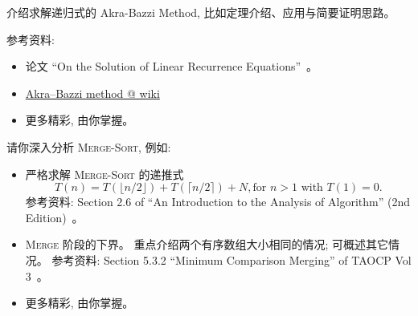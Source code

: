 \documentclass[a4paper, justified]{tufte-handout}
\begin{document}
\begin{solution}
\end{solution}

\beginoptional

\begin{problem}
\end{problem}

\begin{solution}
\end{solution}

\beginot

\begin{ot}
  介绍求解递归式的 Akra-Bazzi Method, 比如定理介绍、应用与简要证明思路。

  \noindent 参考资料:
  \begin{itemize}
    \item 论文 ``On the Solution of Linear Recurrence Equations''~\cite{ABMethod}。
    \item \href{https://en.wikipedia.org/wiki/Akra\%E2\%80\%93Bazzi\_method}{Akra–Bazzi method @ wiki}
    \item 更多精彩, 由你掌握。
  \end{itemize}
\end{ot}

\vspace{0.50cm}
\begin{ot}
  请你深入分析 \textsc{Merge-Sort}, 例如:
  \begin{itemize}
    \item 严格求解 \textsc{Merge-Sort} 的递推式
      \[
        T(n) = T(\lfloor n/2 \rfloor) + T(\lceil n/2 \rceil) + N, \text{for } n > 1 \text{ with } T(1) = 0.
      \]
      参考资料: Section 2.6 of ``An Introduction to the Analysis of Algorithm'' (2nd Edition)~\cite{AoA}。
    \item \textsc{Merge} 阶段的下界。
      重点介绍两个有序数组大小相同的情况; 可概述其它情况。
      参考资料: Section 5.3.2 ``Minimum Comparison Merging'' of TAOCP Vol 3~\cite{TAOCP-Vol3}。
    \item 更多精彩, 由你掌握。
  \end{itemize}
\end{ot}

\end{document}
